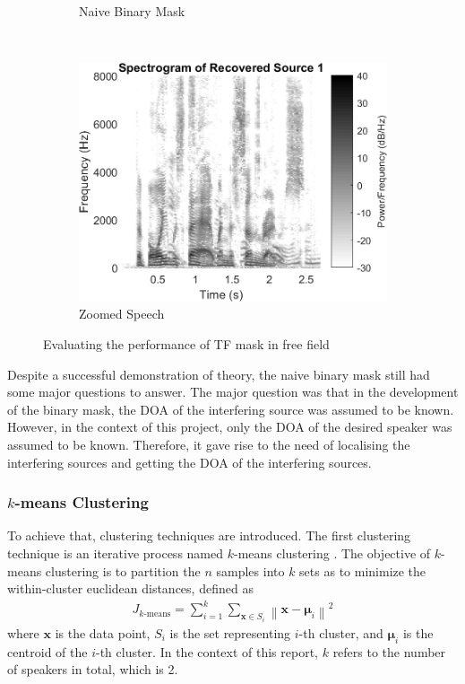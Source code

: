 \documentclass[a4paper,twoside,12pt,hidelinks]{article}
\begin{document}
\begin{figure}[H]
\begin{subfigure}[H]{0.49\textwidth}
\caption{Naive Binary Mask}
\end{subfigure}
\\[1em]
\begin{subfigure}[H]{0.49\textwidth}
\includegraphics[width=\textwidth]{spectnaive1}
\caption{Zoomed Speech}
\end{subfigure}
\caption{Evaluating the performance of TF mask in free field}
\label{fig:speccomp}
\end{figure}

Despite a successful demonstration of theory, the naive binary mask still had some major questions to answer. The major question was that in the development of the binary mask, the DOA of the interfering source was assumed to be known. However, in the context of this project, only the DOA of the desired speaker was assumed to be known. Therefore, it gave rise to the need of localising the interfering sources and getting the DOA of the interfering sources. 
\subsubsection{$k$-means Clustering}
To achieve that, clustering techniques are introduced. The first clustering technique is an iterative process named $k$-means clustering \cite{Hartigan1979}. The objective of $k$-means clustering is to partition the $n$ samples into $k$ sets as to minimize the within-cluster euclidean distances, defined as
\begin{align}
J_\text{$k$-means} =\sum _{i=1}^{k}\sum _{\mathbf {x} \in S_{i}}\left\|\mathbf{x} -{\boldsymbol {\mu }}_{i}\right\|^{2} \label{eq:objkmeans}
\end{align}
where $\mathbf{x}$ is the data point, $S_i$ is the set representing $i$-th cluster, and ${\boldsymbol {\mu }}_{i}$ is the centroid of the $i$-th cluster. In the context of this report, $k$ refers to the number of speakers in total, which is 2.
\end{document}
